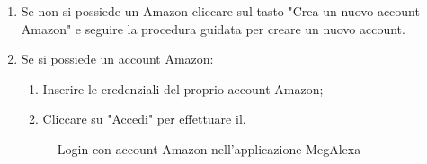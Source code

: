 \begin{enumerate}
\item Se non si possiede un Amazon cliccare sul tasto "Crea un nuovo account Amazon" e seguire la procedura guidata per creare un nuovo account.
\item Se si possiede un account Amazon:
\begin{enumerate}
	\item Inserire le credenziali del proprio account Amazon;
	\item Cliccare su "Accedi" per effettuare il.
\end{enumerate}
\begin{figure}[!ht]
	\centering
	\caption{Login con account Amazon nell'applicazione MegAlexa}
\end{figure}
\end{enumerate}
\newpage
